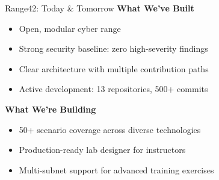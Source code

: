 \documentclass[aspectratio=169]{beamer}
\begin{document}
\begin{frame}{Range42: Today \& Tomorrow \; \faCheckCircle}
  \textbf{What We've Built}
  \begin{itemize}
    \item Open, modular cyber range
    \item Strong security baseline: zero high-severity findings
    \item Clear architecture with multiple contribution paths
    \item Active development: 13 repositories, 500+ commits
  \end{itemize}
  \vspace{3mm}
  \textbf{What We're Building}
  \begin{itemize}
    \item 50+ scenario coverage across diverse technologies
    \item Production-ready lab designer for instructors
    \item Multi-subnet support for advanced training exercises
  \end{itemize}
\end{frame}
\end{document}
